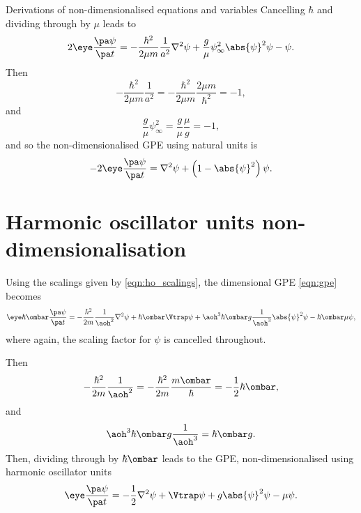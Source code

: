 \begin{chapter}{\label{cha:nondim}Derivations of non-dimensionalised equations
and variables}
  Cancelling $\hbar$ and dividing through by $\mu$ leads to
  \begin{equation*}
    2\eye \frac{\pa \psi}{\pa t} = -\frac{\hbar^{2}}{2\mu m} \frac{1}{a^{2}}
    \nabla^{2} \psi + \frac{g}{\mu} \psi_{\infty}^{2} \abs{\psi}^{2} \psi -
    \psi.
  \end{equation*}
  Then
  \begin{equation*}
    -\frac{\hbar^{2}}{2\mu m} \frac{1}{a^{2}} = -\frac{\hbar^{2}}{2\mu m}
    \frac{2\mu m}{\hbar^{2}} = -1,
  \end{equation*}
  and
  \begin{equation*}
    \frac{g}{\mu} \psi_{\infty}^{2} = \frac{g}{\mu} \frac{\mu}{g} = -1,
  \end{equation*}
  and so the non-dimensionalised GPE using natural units is
  \begin{equation*}
    -2\eye\frac{\pa \psi}{\pa t} = \nabla^{2}\psi + \left(1 -
    \abs{\psi}^{2}\right)\psi.
  \end{equation*}

  \section{Harmonic oscillator units non-dimensionalisation}
  Using the scalings given by \eqref{eqn:ho_scalings}, the dimensional GPE
  \ref{eqn:gpe} becomes
  \begin{equation*}
    \eye \hbar \ombar \frac{\pa \psi}{\pa t} = -\frac{\hbar^{2}}{2m}
    \frac{1}{\aoh^{2}} \nabla^{2} \psi + \hbar \ombar \Vtrap \psi + \aoh^{3}
    \hbar \ombar g \frac{1}{\aoh^{3}} \abs{\psi}^{2} \psi - \hbar \ombar \mu
    \psi,
  \end{equation*}
  where again, the scaling factor for $\psi$ is cancelled throughout.

  Then
  \begin{equation*}
    -\frac{\hbar^{2}}{2m} \frac{1}{\aoh^{2}} = -\frac{\hbar^{2}}{2m}
    \frac{m\ombar}{\hbar} = -\frac{1}{2} \hbar \ombar,
  \end{equation*}
  and
  \begin{equation*}
    \aoh^{3} \hbar \ombar g \frac{1}{\aoh^{3}} = \hbar \ombar g.
  \end{equation*}
  Then, dividing through by $\hbar \ombar$ leads to the GPE,
  non-dimensionalised using harmonic oscillator units
  \begin{equation*}
    \eye \frac{\pa \psi}{\pa t} = -\frac{1}{2}\nabla^{2}\psi + \Vtrap\psi +
    g\abs{\psi}^{2}\psi - \mu\psi.
  \end{equation*}


\end{chapter}
